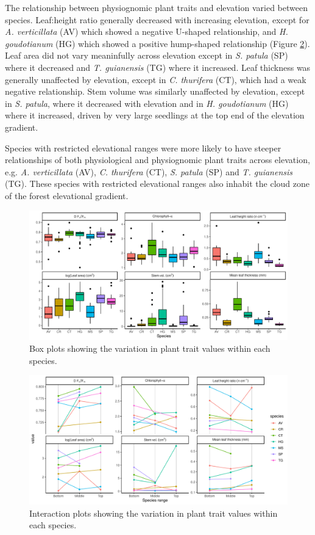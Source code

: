 \documentclass[a4paper, 11pt]{article}
\begin{document}
The relationship between physiognomic plant traits and elevation varied between species. Leaf:height ratio generally decreased with increasing elevation, except for \textit{A. verticillata} (AV) which showed a negative U-shaped relationship, and \textit{H. goudotianum} (HG) which showed a positive hump-shaped relationship (Figure \ref{spaghetti}). Leaf area did not vary meaninfully across elevation except in \textit{S. patula} (SP) where it decreased and \textit{T. guianensis} (TG) where it increased. Leaf thickness was generally unaffected by elevation, except in \textit{C. thurifera} (CT), which had a weak negative relationship. Stem volume was similarly unaffected by elevation, except in \textit{S. patula}, where it decreased with elevation and in \textit{H. goudotianum} (HG) where it increased, driven by very large seedlings at the top end of the elevation gradient. 

Species with restricted elevational ranges were more likely to have steeper relationships of both physiological and physiognomic plant traits across elevation, e.g. \textit{A. verticillata} (AV), \textit{C. thurifera} (CT), \textit{S. patula} (SP) and \textit{T. guianensis} (TG). These species with restricted elevational ranges also inhabit the cloud zone of the forest elevational gradient. 

\begin{figure}[H]
\includegraphics[width=\textwidth]{box}
\centering
\caption{Box plots showing the variation in plant trait values within each species.}
\label{box}
\end{figure}

\begin{figure}[H]
\includegraphics[width=\textwidth]{spaghetti}
\centering
\caption{Interaction plots showing the variation in plant trait values within each species.}
\label{spaghetti}
\end{figure}
\end{document}

